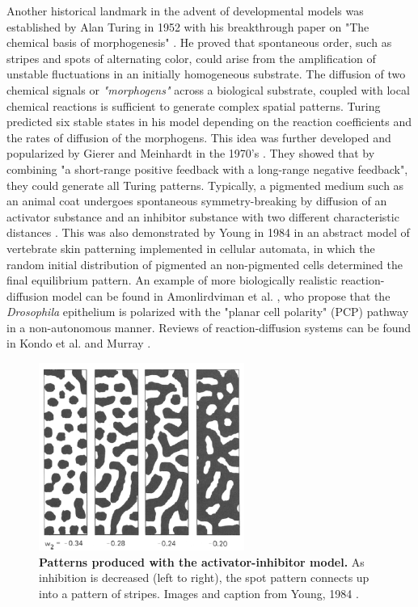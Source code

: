   Another historical landmark in the advent of developmental models was established by Alan Turing in 1952 with his breakthrough paper on "The chemical basis of morphogenesis" \cite{Turing:1952vn}. He proved that spontaneous order, such as stripes and spots of alternating color, could arise from the amplification of unstable fluctuations in an initially homogeneous substrate. The diffusion of two chemical signals or \textit{"morphogens"} across a biological substrate, coupled with local chemical reactions is sufficient to generate complex spatial patterns. Turing predicted six stable states in his model depending on the reaction coefficients and the rates of diffusion of the morphogens. This idea was further developed and popularized by Gierer and Meinhardt in the 1970's \cite{Gierer:1972et}. They showed that by combining "a short-range positive feedback with a long-range negative feedback", they could generate all Turing patterns. Typically, a pigmented medium such as an animal coat undergoes spontaneous symmetry-breaking by diffusion of an activator substance and an inhibitor substance with two different characteristic distances \cite{Meinhardt:1974vd}. This was also demonstrated by Young in 1984 \cite{Young:1984hd} in an abstract model of vertebrate skin patterning implemented in cellular automata, in which the random initial distribution of pigmented an non-pigmented cells determined the final equilibrium pattern. An example of more biologically realistic reaction-diffusion model can be found in Amonlirdviman et al. \cite{Amonlirdviman:2005dz}, who propose that the \textit{Drosophila} epithelium is polarized with the "planar cell polarity" (PCP) pathway in a non-autonomous manner. Reviews of reaction-diffusion systems can be found in Kondo et al. \cite{Kondo:2010bx} and Murray \cite{Murray:2001uq}\cite{Murray:2003ty}. 
\begin{figure}
\begin{center}
\includegraphics[width=0.6\textwidth]{../../images/biomechanics_sota/young_1984.png}
\end{center}
\caption{\textbf{Patterns produced with the activator-inhibitor model.} As inhibition is decreased (left to right), the spot pattern connects up into a pattern of stripes. Images and caption from Young, 1984 \cite{Young:1984hd}.}
\label{biomechanics_sota_young_1984}
\end{figure}

